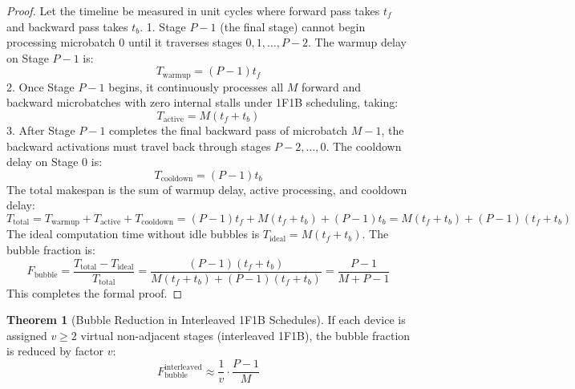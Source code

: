 \documentclass[11pt,a4paper]{article}
\theoremstyle{definition}
\newtheorem{theorem}{\textbf{Theorem}}[section]
\begin{document}
\begin{proof}
Let the timeline be measured in unit cycles where forward pass takes $t_f$ and backward pass takes $t_b$.
1. Stage $P - 1$ (the final stage) cannot begin processing microbatch 0 until it traverses stages $0, 1, \dots, P - 2$.
The warmup delay on Stage $P - 1$ is:
{\boldmath
\begin{equation}
T_{\text{warmup}} = (P - 1) t_f
\end{equation}
}
2. Once Stage $P - 1$ begins, it continuously processes all $M$ forward and backward microbatches with zero internal stalls under 1F1B scheduling, taking:
{\boldmath
\begin{equation}
T_{\text{active}} = M(t_f + t_b)
\end{equation}
}
3. After Stage $P - 1$ completes the final backward pass of microbatch $M - 1$, the backward activations must travel back through stages $P - 2, \dots, 0$. The cooldown delay on Stage 0 is:
{\boldmath
\begin{equation}
T_{\text{cooldown}} = (P - 1) t_b
\end{equation}
}
The total makespan is the sum of warmup delay, active processing, and cooldown delay:
{\boldmath
\begin{equation}
T_{\text{total}} = T_{\text{warmup}} + T_{\text{active}} + T_{\text{cooldown}} = (P - 1) t_f + M(t_f + t_b) + (P - 1) t_b = M(t_f + t_b) + (P - 1)(t_f + t_b)
\end{equation}
}
The ideal computation time without idle bubbles is $T_{\text{ideal}} = M(t_f + t_b)$.
The bubble fraction is:
{\boldmath
\begin{equation}
F_{\text{bubble}} = \frac{T_{\text{total}} - T_{\text{ideal}}}{T_{\text{total}}} = \frac{(P - 1)(t_f + t_b)}{M(t_f + t_b) + (P - 1)(t_f + t_b)} = \frac{P - 1}{M + P - 1}
\end{equation}
}
This completes the formal proof.
\end{proof}

\begin{theorem}[Bubble Reduction in Interleaved 1F1B Schedules]
If each device is assigned $v \ge 2$ virtual non-adjacent stages (interleaved 1F1B), the bubble fraction is reduced by factor $v$:
{\boldmath
\begin{equation}
F_{\text{bubble}}^{\text{interleaved}} \approx \frac{1}{v} \cdot \frac{P - 1}{M}
\end{equation}
}
\end{theorem}
\end{document}
